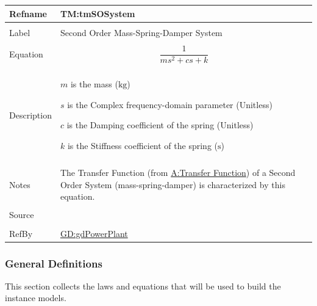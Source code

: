 \documentclass[12pt]{article}
\begin{document}
\begin{minipage}{\textwidth}
\begin{tabular}{>{\raggedright}p{}>{\raggedright\arraybackslash}p{}}
\toprule \textbf{Refname} & \textbf{TM:tmSOSystem}
\label{TM:tmSOSystem}
\\ \midrule \\
Label & Second Order Mass-Spring-Damper System
        
\\ \midrule \\
Equation & \begin{displaymath}
           \frac{1}{m s^{2}+c s+k}
           \end{displaymath}
\\ \midrule \\
Description & \begin{symbDescription}
              \item{$m$ is the mass (${\text{kg}}$)}
              \item{$s$ is the Complex frequency-domain parameter (Unitless)}
              \item{$c$ is the Damping coefficient of the spring (Unitless)}
              \item{$k$ is the Stiffness coefficient of the spring (${\text{s}}$)}
              \end{symbDescription}
\\ \midrule \\
Notes & The Transfer Function (from \hyperref[pwrPlantTxFnx]{A:Transfer Function}) of a Second Order System (mass-spring-damper) is characterized by this equation.
        
\\ \midrule \\
Source & \cite{abbasi2015}
         
\\ \midrule \\
RefBy & \hyperref[GD:gdPowerPlant]{GD:gdPowerPlant}
        
\\ \bottomrule
\end{tabular}
\end{minipage}
\subsubsection{General Definitions}
\label{Sec:GDs}
This section collects the laws and equations that will be used to build the instance models.
\end{document}
